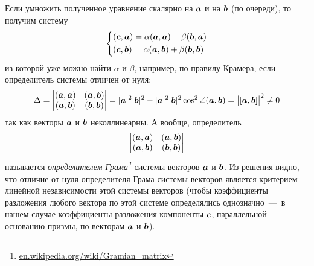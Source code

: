 \documentclass[a4paper,12pt]{article}
\begin{document}
\begin{solution}
    Если умножить полученное уравнение скалярно на $\boldsymbol a$ и на $\boldsymbol b$ (по очереди), то получим систему
    \[
      \left\{
        \begin{aligned}
          &(\boldsymbol c, \boldsymbol a) = \alpha (\boldsymbol a, \boldsymbol a) + \beta (\boldsymbol b, \boldsymbol a)\\
          &(\boldsymbol c, \boldsymbol b) = \alpha (\boldsymbol a, \boldsymbol b) + \beta (\boldsymbol b, \boldsymbol b)
        \end{aligned}
      \right.
    \]
    из которой уже можно найти $\alpha$ и $\beta$, например, по правилу Крамера, если определитель системы отличен от нуля:
    \[
      \Delta = \begin{vmatrix}
        (\boldsymbol a, \boldsymbol a) & (\boldsymbol a, \boldsymbol b)\\
        (\boldsymbol a, \boldsymbol b) & (\boldsymbol b, \boldsymbol b)
      \end{vmatrix}
      = |\boldsymbol a|^2 |\boldsymbol b|^2 - |\boldsymbol a|^2 |\boldsymbol b|^2 \cos^2 \angle{(\boldsymbol a, \boldsymbol b)}
      = \bigl|[\boldsymbol a, \boldsymbol b]\bigr|^2
      \not= 0
    \]
    так как векторы $\boldsymbol a$ и $\boldsymbol b$ неколлинеарны.
    А вообще, определитель
    \[
      \begin{vmatrix}
        (\boldsymbol a, \boldsymbol a) & (\boldsymbol a, \boldsymbol b)\\
        (\boldsymbol a, \boldsymbol b) & (\boldsymbol b, \boldsymbol b)
      \end{vmatrix}
    \]
    называется \emph{определителем Грама\footnote{\href{https://en.wikipedia.org/wiki/Gramian\_matrix}{en.wikipedia.org/wiki/Gramian\_matrix}}} системы векторов $\boldsymbol a$ и $\boldsymbol b$.
    Из решения видно, что отличие от нуля определителя Грама системы векторов является критерием линейной независимости этой системы векторов (чтобы коэффициенты разложения любого вектора по этой системе определялись однозначно~---~в нашем случае коэффициенты разложения компоненты $\boldsymbol c$, параллельной основанию призмы, по векторам $\boldsymbol a$ и $\boldsymbol b$).
  \end{solution}
\end{document}
